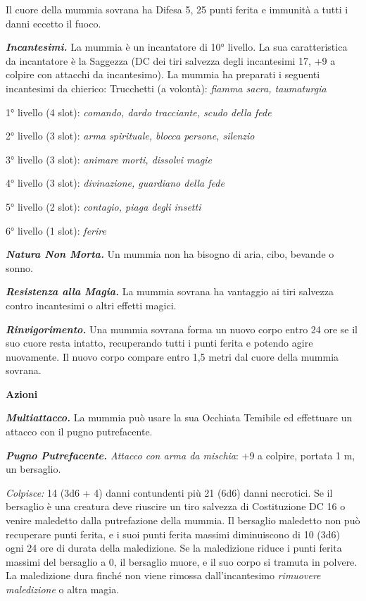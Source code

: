 \begin{multicols}{2}
Il cuore della mummia sovrana ha Difesa 5, 25 punti ferita e immunità a
tutti i danni eccetto il fuoco.

\emph{\textbf{Incantesimi.}} La mummia è un incantatore di 10° livello.
La sua caratteristica da incantatore è la Saggezza (DC dei tiri salvezza
degli incantesimi 17, +9 a colpire con attacchi da incantesimo). La
mummia ha preparati i seguenti incantesimi da chierico: Trucchetti (a
volontà): \emph{fiamma sacra, taumaturgia}

1° livello (4 slot): \emph{comando, dardo tracciante, scudo della fede}

2° livello (3 slot): \emph{arma spirituale, blocca persone, silenzio}

3° livello (3 slot): \emph{animare morti, dissolvi magie}

4° livello (3 slot): \emph{divinazione, guardiano della fede}

5° livello (2 slot): \emph{contagio, piaga degli insetti}

6° livello (1 slot): \emph{ferire}

\emph{\textbf{Natura Non Morta.}} Un mummia non ha bisogno di aria,
cibo, bevande o sonno.

\emph{\textbf{Resistenza alla Magia.}} La mummia sovrana ha vantaggio ai
tiri salvezza contro incantesimi o altri effetti magici.

\emph{\textbf{Rinvigorimento.}} Una mummia sovrana forma un nuovo corpo
entro 24 ore se il suo cuore resta intatto, recuperando tutti i punti
ferita e potendo agire nuovamente. Il nuovo corpo compare entro 1,5
metri dal cuore della mummia sovrana.

\smallskip\textbf{Azioni}

\emph{\textbf{Multiattacco.}} La mummia può usare la sua Occhiata
Temibile ed effettuare un attacco con il pugno putrefacente.

\emph{\textbf{Pugno Putrefacente.} Attacco con arma da mischia}: +9 a
colpire, portata 1 m, un bersaglio.

\emph{Colpisce:} 14 (3d6 + 4) danni contundenti più 21 (6d6) danni
necrotici. Se il bersaglio è una creatura deve riuscire un tiro salvezza
di Costituzione DC 16 o venire maledetto dalla putrefazione della
mummia. Il bersaglio maledetto non può recuperare punti ferita, e i suoi
punti ferita massimi diminuiscono di 10 (3d6) ogni 24 ore di durata
della maledizione. Se la maledizione riduce i punti ferita massimi del
bersaglio a 0, il bersaglio muore, e il suo corpo si tramuta in polvere.
La maledizione dura finché non viene rimossa dall'incantesimo
\emph{rimuovere maledizione} o altra magia.


\end{multicols}
